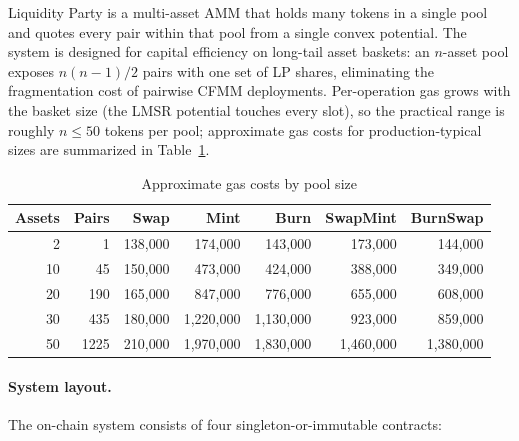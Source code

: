 \documentclass[11pt]{article}
\begin{document}
Liquidity Party is a multi-asset AMM that holds many tokens in a single pool
and quotes every pair within that pool from a single convex potential. The
system is designed for capital efficiency on long-tail asset baskets: an
$n$-asset pool exposes $n(n-1)/2$ pairs with one set of LP shares,
eliminating the fragmentation cost of pairwise CFMM deployments. Per-operation
gas grows with the basket size (the LMSR potential touches every slot), so the
practical range is roughly $n \le 50$ tokens per pool; approximate gas costs
for production-typical sizes are summarized in Table~\ref{tab:gas}.

\begin{table}[h]
\centering
\caption{Approximate gas costs by pool size}
\label{tab:gas}
\begin{tabular}{rrrrrrr}
\toprule
Assets & Pairs & Swap & Mint & Burn & SwapMint & BurnSwap \\
\midrule
 2 &    1 & 138{,}000 &   174{,}000 &   143{,}000 &   173{,}000 &   144{,}000 \\
10 &   45 & 150{,}000 &   473{,}000 &   424{,}000 &   388{,}000 &   349{,}000 \\
20 &  190 & 165{,}000 &   847{,}000 &   776{,}000 &   655{,}000 &   608{,}000 \\
30 &  435 & 180{,}000 & 1{,}220{,}000 & 1{,}130{,}000 &   923{,}000 &   859{,}000 \\
50 & 1225 & 210{,}000 & 1{,}970{,}000 & 1{,}830{,}000 & 1{,}460{,}000 & 1{,}380{,}000 \\
\bottomrule
\end{tabular}
\end{table}

\paragraph{System layout.}
The on-chain system consists of four singleton-or-immutable contracts:
\end{document}
